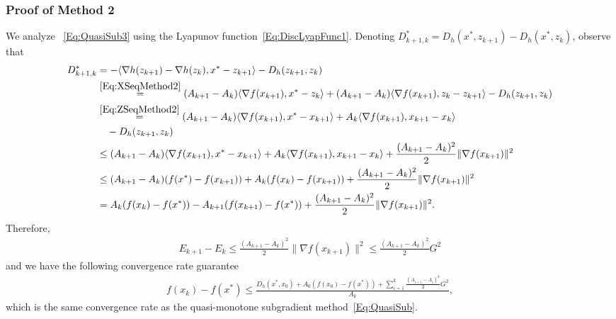 \documentclass[11pt]{article}
\theoremstyle{plain}
\begin{document}
\subsubsection{Proof of Method 2}  We analyze ~\eqref{Eq:QuasiSub3} using the Lyapunov function~\eqref{Eq:DiscLyapFunc1}. Denoting $D^\ast_{k+1, k} = D_h(x^\ast,z_{k+1})- D_h(x^\ast,z_{k})$, observe that
\begin{subequations}%
\begin{align}
D^\ast_{k+1, k} &= -\langle \nabla h(z_{k+1}) - \nabla h(z_k), x^\ast - z_{k+1}\rangle - D_h(z_{k+1}, z_k)\notag\\
& \overset{\eqref{Eq:XSeqMethod2}}{=} (A_{k+1} - A_k) \langle \nabla f(x_{k+1}), x^\ast - z_{k}\rangle  + (A_{k+1} - A_k) \langle \nabla f(x_{k+1}), z_{k} - z_{k+1}\rangle - D_h(z_{k+1}, z_k)\notag\\
& \overset{\eqref{Eq:ZSeqMethod2}}{=}(A_{k+1} - A_k) \langle \nabla f(x_{k+1}), x^\ast - x_{k+1}\rangle + A_k \langle \nabla f(x_{k+1}), x_{k+1} - x_k\rangle\notag \\&\quad- D_h(z_{k+1}, z_k)\notag\\
& \leq(A_{k+1} - A_k) \langle \nabla f(x_{k+1}), x^\ast - x_{k+1}\rangle + A_k \langle \nabla f(x_{k+1}), x_{k+1} - x_k\rangle+ \frac{(A_{k+1} - A_k)^2}{2} \|\nabla f(x_{k+1})\|^2 \notag\\
%
&\leq (A_{k+1} - A_k)(f(x^\ast) - f(x_{k+1})) + A_k (f(x_k) - f(x_{k+1}))  + \frac{(A_{k+1} - A_k)^2}{2} \|\nabla f(x_{k+1})\|^2 \notag\\
& = A_k (f(x_k) - f(x^\ast)) - A_{k+1}(f(x_{k+1}) - f(x^\ast))  + \frac{(A_{k+1} - A_k)^2}{2} \|\nabla f(x_{k+1})\|^2 \notag.
\end{align}
\end{subequations}
Therefore, 
\begin{align*}
E_{k+1} - E_k \leq  \frac{(A_{k+1} - A_k)^2}{2} \|\nabla f(x_{k+1})\|^2 \leq  \frac{(A_{k+1} - A_k)^2}{2} G^2
\end{align*}
and we have the following convergence rate guarantee
\begin{align*}
f(x_k) - f(x^\ast) \leq \frac{D_h(x^\ast, x_0) + A_0(f(x_0)- f(x^\ast))+ \sum_{i=1}^k\frac{(A_{i+1} - A_i)^2}{2} G^2}{A_k},
\end{align*}
which is the same convergence rate as the quasi-monotone subgradient method~\eqref{Eq:QuasiSub}. 
\end{document}
